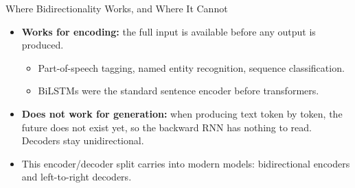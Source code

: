 \begin{frame}{Where Bidirectionality Works, and Where It Cannot}
  \begin{itemize}
    \item \textbf{Works for encoding:} the full input is available before any output is produced.
    \begin{itemize}
      \item Part-of-speech tagging, named entity recognition, sequence classification.
      \item BiLSTMs were the standard sentence encoder before transformers.
    \end{itemize}
    \item \textbf{Does not work for generation:} when producing text token by token, the future does not exist yet, so the backward RNN has nothing to read. Decoders stay unidirectional.
    \item This encoder/decoder split carries into modern models: bidirectional encoders and left-to-right decoders.
  \end{itemize}
\end{frame}
